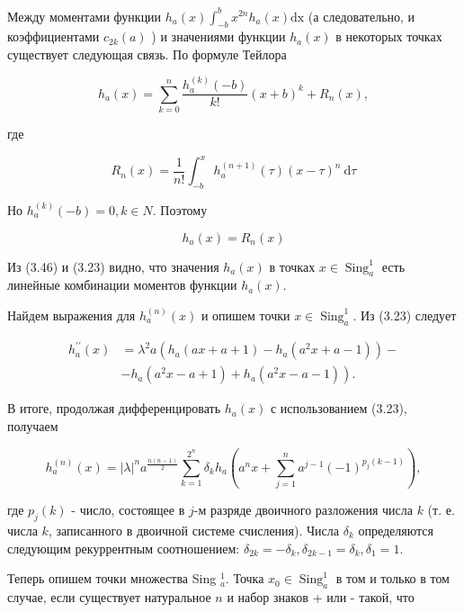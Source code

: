 \documentclass[10pt]{article}
\begin{document}
Между моментами функции $h_{a}(x) \int_{-b}^{b} x^{2 n} h_{a}(x) \mathrm{dx}$ (а следовательно, и коэффициентами $c_{2 k}(a)$ ) и значениями функции $h_{a}(x)$ в некоторых точках существует следующая связь. По формуле Тейлора

$$
h_{a}(x)=\sum_{k=0}^{n} \frac{h_{a}^{(k)}(-b)}{k!}(x+b)^{k}+R_{n}(x),
$$

где


\begin{equation*}
R_{n}(x)=\frac{1}{n!} \int_{-b}^{x} h_{a}^{(n+1)}(\tau)(x-\tau)^{n} \mathrm{~d} \tau \tag{3.46}
\end{equation*}


Но $h_{a}^{(k)}(-b)=0, k \in N$. Поэтому


\begin{equation*}
h_{a}(x)=R_{n}(x) \tag{3.47}
\end{equation*}


Из (3.46) и (3.23) видно, что значения $h_{a}(x)$ в точках $x \in \operatorname{Sing}_{a}^{1}$ есть линейные комбинации моментов функции $h_{a}(x)$.

Найдем выражения для $h_{a}^{(n)}(x)$ и опишем точки $x \in \operatorname{Sing}_{a}^{1}$. Из (3.23) следует


\begin{align*}
h_{a}^{\prime \prime}(x) & =\lambda^{2} a\left(h_{a}(a x+a+1)-h_{a}\left(a^{2} x+a-1\right)\right)- \\
& \left.-h_{a}\left(a^{2} x-a+1\right)+h_{a}\left(a^{2} x-a-1\right)\right) . \tag{3.48}
\end{align*}


В итоге, продолжая дифференцировать $h_{a}(x)$ с использованием (3.23), получаем


\begin{equation*}
h_{a}^{(n)}(x)=|\lambda|^{n} a^{\frac{n(n-1)}{2}} \sum_{k=1}^{2^{n}} \delta_{k} h_{a}\left(a^{n} x+\sum_{j=1}^{n} a^{j-1}(-1)^{p_{j}(k-1)}\right), \tag{3.49}
\end{equation*}


где $p_{j}(k)$ - число, состоящее в $j$-м разряде двоичного разложения числа $k$ (т. е. числа $k$, записанного в двоичной системе счисления). Числа $\delta_{k}$ определяются следующим рекуррентным соотношением: $\delta_{2 k}=-\delta_{k}, \delta_{2 k-1}=\delta_{k}, \delta_{1}=1$.

Теперь опишем точки множества Sing ${ }_{a}^{1}$. Точка $x_{0} \in \operatorname{Sing}_{a}^{1}$ в том и только в том случае, если существует натуральное $n$ и набор знаков + или - такой, что
\end{document}
